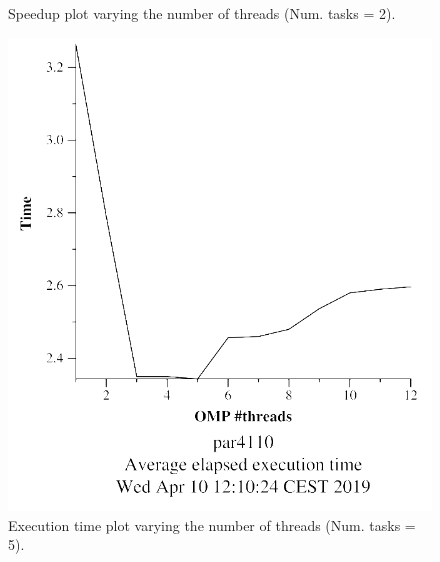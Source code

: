 \documentclass[12pt, a4paper]{article}
\begin{document}
\begin{figure}[H]
\begin{minipage}[b]{0.4\linewidth}
  \caption{Speedup plot varying the number of threads (Num. tasks = 2).}
  \label{fig:mandel-omp-10000-strong-omp-3-2-speedup}
\end{minipage}
\end{figure}

\begin{figure}[H]
\centering
\begin{minipage}[b]{0.4\linewidth}
  \centering
  \includegraphics[scale=0.5]{./mandel-omp-10000-strong-omp-3-5-time}
  \caption{Execution time plot varying the number of threads (Num. tasks = 5).}
  \label{fig:mandel-omp-10000-strong-omp-3-5-time}
\end{minipage}%
\hspace{0.5cm}
\begin{minipage}[b]{0.4\linewidth}
  \centering

\end{minipage}
\end{figure}
\end{document}
